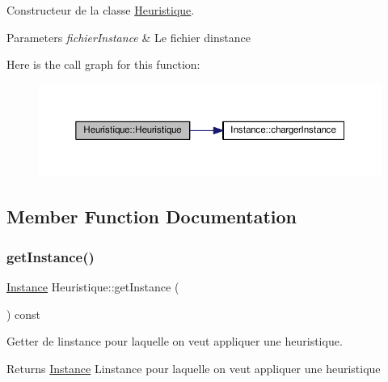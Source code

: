 Constructeur de la classe \hyperlink{classHeuristique}{Heuristique}. 


\begin{DoxyParams}{Parameters}
{\em fichier\+Instance} & Le fichier d\textquotesingle{}instance \\
\hline
\end{DoxyParams}
Here is the call graph for this function\+:\nopagebreak
\begin{figure}[H]
\begin{center}
\leavevmode
\includegraphics[width=350pt]{classHeuristique_a6d5f8c9f55e42a8713c8a5636d9cef1b_cgraph}
\end{center}
\end{figure}


\subsection{Member Function Documentation}
\mbox{\label{classHeuristique_aa6eca6703702298968f03ac30c4be86f}} 
\subsubsection{\texorpdfstring{get\+Instance()}{getInstance()}}
{\footnotesize\ttfamily \hyperlink{classInstance}{Instance} Heuristique\+::get\+Instance (\begin{DoxyParamCaption}{ }\end{DoxyParamCaption}) const}



Getter de l\textquotesingle{}instance pour laquelle on veut appliquer une heuristique. 

\begin{DoxyReturn}{Returns}
\hyperlink{classInstance}{Instance} L\textquotesingle{}instance pour laquelle on veut appliquer une heuristique 
\end{DoxyReturn}
\mbox{\label{classHeuristique_aee20a4baec95a33533a6e13029c437df}} 

